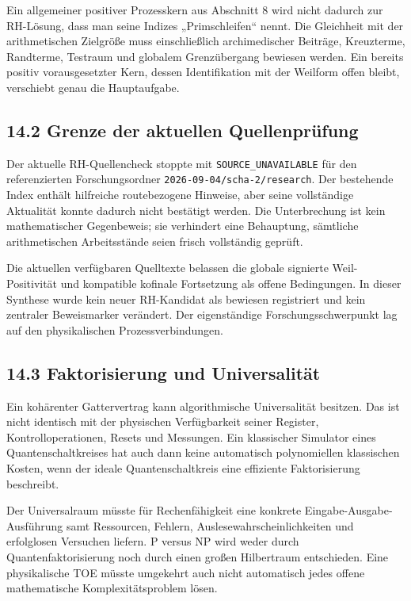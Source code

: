 Ein allgemeiner positiver Prozesskern aus Abschnitt 8 wird nicht dadurch
zur RH-Lösung, dass man seine Indizes „Primschleifen`` nennt. Die
Gleichheit mit der arithmetischen Zielgröße muss einschließlich
archimedischer Beiträge, Kreuzterme, Randterme, Testraum und globalem
Grenzübergang bewiesen werden. Ein bereits positiv vorausgesetzter Kern,
dessen Identifikation mit der Weilform offen bleibt, verschiebt genau
die Hauptaufgabe.

\subsection{14.2 Grenze der aktuellen
Quellenprüfung}\label{grenze-der-aktuellen-quellenpruxfcfung}

Der aktuelle RH-Quellencheck stoppte mit \texttt{SOURCE\_UNAVAILABLE}
für den referenzierten Forschungsordner
\texttt{2026-09-04/scha-2/research}. Der bestehende Index enthält
hilfreiche routebezogene Hinweise, aber seine vollständige Aktualität
konnte dadurch nicht bestätigt werden. Die Unterbrechung ist kein
mathematischer Gegenbeweis; sie verhindert eine Behauptung, sämtliche
arithmetischen Arbeitsstände seien frisch vollständig geprüft.

Die aktuellen verfügbaren Quelltexte belassen die globale signierte
Weil-Positivität und kompatible kofinale Fortsetzung als offene
Bedingungen. In dieser Synthese wurde kein neuer RH-Kandidat als
bewiesen registriert und kein zentraler Beweismarker verändert. Der
eigenständige Forschungsschwerpunkt lag auf den physikalischen
Prozessverbindungen.

\subsection{14.3 Faktorisierung und
Universalität}\label{faktorisierung-und-universalituxe4t}

Ein kohärenter Gattervertrag kann algorithmische Universalität besitzen.
Das ist nicht identisch mit der physischen Verfügbarkeit seiner
Register, Kontrolloperationen, Resets und Messungen. Ein klassischer
Simulator eines Quantenschaltkreises hat auch dann keine automatisch
polynomiellen klassischen Kosten, wenn der ideale Quantenschaltkreis
eine effiziente Faktorisierung beschreibt.

Der Universalraum müsste für Rechenfähigkeit eine konkrete
Eingabe-Ausgabe-Ausführung samt Ressourcen, Fehlern,
Auslesewahrscheinlichkeiten und erfolglosen Versuchen liefern. P versus
NP wird weder durch Quantenfaktorisierung noch durch einen großen
Hilbertraum entschieden. Eine physikalische TOE müsste umgekehrt auch
nicht automatisch jedes offene mathematische Komplexitätsproblem lösen.

